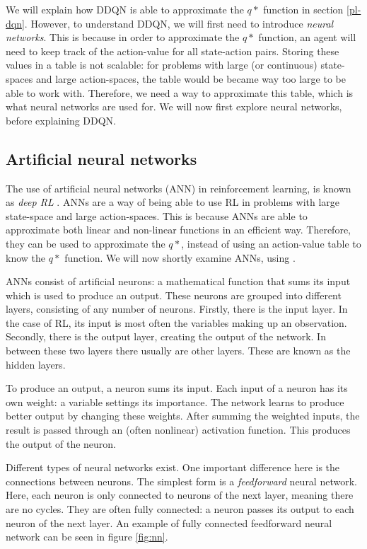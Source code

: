 We will explain how DDQN is able to approximate the $q*$ function in section \ref{pl-dqn}. However, to understand DDQN, we will first need to introduce \emph{neural networks}. This is because in order to approximate the $q*$ function, an agent will need to keep track of the action-value for all state-action pairs. Storing these values in a table is not scalable: for problems with large (or continuous) state-spaces and large action-spaces, the table would be became way too large to be able to work with. Therefore, we need a way to approximate this table, which is what neural networks are used for. We will now first explore neural networks, before explaining DDQN.

\subsection{Artificial neural networks}\label{pl-nn}
The use of artificial neural networks (ANN) in reinforcement learning, is known as \emph{deep RL} \cite[p. 5]{grokking}. ANNs are a way of being able to use RL in problems with large state-space and large action-spaces. This is because ANNs are able to approximate both linear and non-linear functions in an efficient way\cite[p. 165-166]{nn}. Therefore, they can be used to approximate the $q*$, instead of using an action-value table to know the $q*$ function. We will now shortly examine ANNs, using \cite[p. 164-366]{nn}.

ANNs consist of artificial neurons: a mathematical function that sums its input which is used to produce an output. These neurons are grouped into different layers, consisting of any number of neurons. Firstly, there is the input layer. In the case of RL, its input is most often the variables making up an observation. Secondly, there is the output layer, creating the output of the network. In between these two layers there usually are other layers. These are known as the hidden layers. 

To produce an output, a neuron sums its input. Each input of a neuron has its own weight: a variable settings its importance. The network learns to produce better output by changing these weights. After summing the weighted inputs, the result is passed through an (often nonlinear) activation function. This produces the output of the neuron. 

Different types of neural networks exist. One important difference here is the connections between neurons. The simplest form is a \emph{feedforward} neural network. Here, each neuron is only connected to neurons of the next layer, meaning there are no cycles. They are often fully connected: a neuron passes its output to each neuron of the next layer. An example of fully connected feedforward neural network can be seen in figure \ref{fig:nn}.

